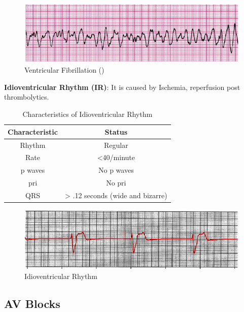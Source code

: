  \begin{figure}[H]
\centering
\includegraphics[scale=0.8]{img/VF.png}
\caption{Ventricular Fibrillation (\cite{arryth_types})}
\label{fig:VF}
\end{figure}

\textbf{Idioventricular Rhythm (IR)}: It is caused by Ischemia, reperfusion post thrombolytics.

\begin{table}[H]
\begin{center}
\begin{tabular}{||c || c||}
 \hline
\textbf{Characteristic} & \textbf{Status} \\ [0.4ex] 
 \hline\hline
 Rhythm & Regular \\
\hline
Rate & <40/minute \\
\hline
p waves & No p waves  \\
\hline
pri & No pri  \\
\hline
QRS & > .12 seconds (wide and bizarre) \\
\hline\hline
\end{tabular}
\end{center}
\caption{Characteristics of Idioventricular Rhythm}
\label{table:IR_characteristics}
\end{table}

 \begin{figure}[H]
\centering
\includegraphics[scale=0.8]{img/IR.png}
\caption{Idioventricular Rhythm}
\label{fig:IR}
\end{figure}


\subsection{AV Blocks}

